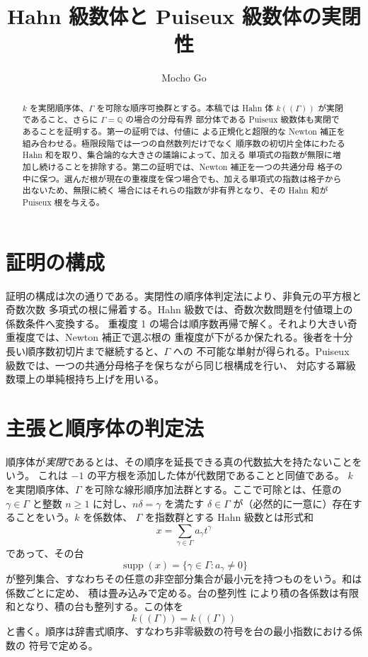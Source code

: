 \documentclass[11pt,uplatex,dvipdfmx]{jsarticle}
\title{Hahn 級数体と Puiseux 級数体の実閉性}
\author{Mocho Go}
\date{}
\newcommand{\Hahn}{k((\Gamma))}
\newcommand{\Supp}{\operatorname{supp}}
\theoremstyle{proofnote}
\begin{document}
\maketitle

\begin{abstract}
  \(k\) を実閉順序体、\(\Gamma\) を可除な順序可換群とする。本稿では Hahn 体
  \(k((\Gamma))\) が実閉であること、さらに \(\Gamma=\mathbb Q\) の場合の分母有界
  部分体である Puiseux 級数体も実閉であることを証明する。第一の証明では、付値に
  よる正規化と超限的な Newton 補正を組み合わせる。極限段階では一つの自然数列だけでなく
  順序数の初切片全体にわたる Hahn 和を取り、集合論的な大きさの議論によって、加える
  単項式の指数が無限に増加し続けることを排除する。第二の証明では、Newton 補正を一つの共通分母
  格子の中に保つ。選んだ根が現在の重複度を保つ場合でも、加える単項式の指数は格子から出ないため、無限に続く
  場合にはそれらの指数が非有界となり、その Hahn 和が Puiseux 根を与える。
\end{abstract}

\tableofcontents

\section*{証明の構成}

証明の構成は次の通りである。実閉性の順序体判定法により、非負元の平方根と奇数次数
多項式の根に帰着する。Hahn 級数では、奇数次数問題を付値環上の係数条件へ変換する。
重複度 1 の場合は順序数再帰で解く。それより大きい奇重複度では、Newton 補正で選ぶ根の
重複度が下がるか保たれる。後者を十分長い順序数初切片まで継続すると、\(\Gamma\) への
不可能な単射が得られる。Puiseux 級数では、一つの共通分母格子を保ちながら同じ根構成を行い、
対応する冪級数環上の単純根持ち上げを用いる。

\section{主張と順序体の判定法}
\label{sec:main}

順序体が\emph{実閉}であるとは、その順序を延長できる真の代数拡大を持たないことをいう。
これは \(-1\) の平方根を添加した体が代数閉であることと同値である。
\(k\) を実閉順序体、\(\Gamma\) を可除な線形順序加法群とする。ここで可除とは、任意の
\(\gamma\in\Gamma\) と整数 \(n\ge1\) に対し、\(n\delta=\gamma\) を満たす
\(\delta\in\Gamma\) が（必然的に一意に）存在することをいう。\(k\) を係数体、
\(\Gamma\) を指数群とする Hahn 級数とは形式和
\[
  x=\sum_{\gamma\in\Gamma}a_\gamma t^\gamma
\]
であって、その台
\[
  \Supp(x)=\{\gamma\in\Gamma:a_\gamma\ne0\}
\]
が整列集合、すなわちその任意の非空部分集合が最小元を持つものをいう。和は係数ごとに定め、
積は畳み込みで定める。台の整列性
により積の各係数は有限和となり、積の台も整列する。この体を
\[
  \Hahn=k((\Gamma))
\]
と書く。順序は辞書式順序、すなわち非零級数の符号を台の最小指数における係数の
符号で定める。
\end{document}
